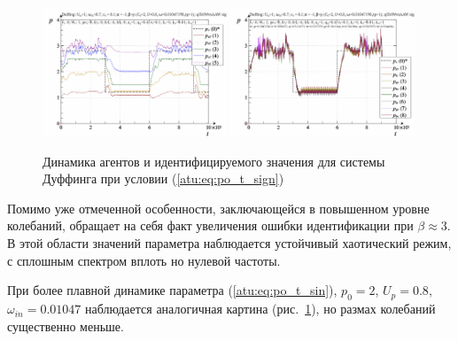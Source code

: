\begin{figure}[ht!]
\begin{center}
  \includegraphics[width=0.49\textwidth]{p/cha/duff/duff_id-p_t_pi_ql3rlWvnAAW_sign.png}
  \hfill
  \includegraphics[width=0.49\textwidth]{p/cha/duff/duff_id-p_t_p_ql3rlWvnAAW_sign.png}
\end{center}
  \caption{Динамика агентов и идентифицируемого значения для системы Дуффинга при условии (\ref{atu:eq:po_t_sign})}
\label{atu:f:duff_id_sign}
\end{figure}

Помимо уже отмеченной особенности, заключающейся в повышенном уровне колебаний,
обращает на себя факт увеличения ошибки идентификации при $\beta \approx 3$.
В этой области значений параметра наблюдается устойчивый хаотический режим,
с сплошным спектром вплоть но нулевой частоты.

При более плавной динамике параметра
(\ref{atu:eq:po_t_sin}),
$p_0=2$, $U_p=0.8$, $\omega_{in}=0.01047$
наблюдается аналогичная картина
(рис.~\ref{atu:f:duff_id_sign}),
но размах колебаний существенно меньше.

